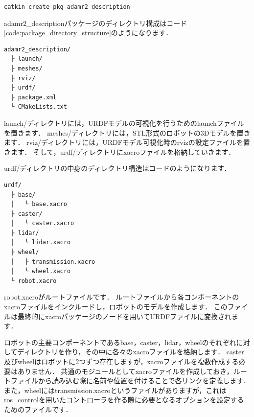 \documentclass[{../../master}]{subfiles}
\begin{document}
\begin{lstlisting}[language=sh, caption=Create a Package to put the URDF Model in]
catkin create pkg adamr2_description
\end{lstlisting}

\textsf{adamr2\_description}パッケージのディレクトリ構成はコード\ref{code:package_directory_structure}のようになります．

\begin{lstlisting}[language=sh, caption=Directory Structure of adamr2\_description, label=code:package_directory_structure]
adamr2_description/
  ├ launch/
  ├ meshes/
  ├ rviz/
  ├ urdf/
  ├ package.xml
  └ CMakeLists.txt
\end{lstlisting}

\textsf{launch/}ディレクトリには，URDFモデルの可視化を行うためのlaunchファイルを置きます．
\textsf{meshes/}ディレクトリには，STL形式のロボットの3Dモデルを置きます．
\textsf{rviz/}ディレクトリには，URDFモデル可視化時の\textsf{rviz}の設定ファイルを置きます．
そして，\textsf{urdf/}ディレクトリにxacroファイルを格納していきます．

\textsf{urdf/}ディレクトリの中身のディレクトリ構造はコードのようになります．

\begin{lstlisting}[language=sh, caption=Directory Structure of \textsf{urdf/}, label=code:urdf_directory_structure]
urdf/
  ├ base/
  │   └ base.xacro
  ├ caster/
  │   └ caster.xacro
  ├ lidar/
  │   └ lidar.xacro
  ├ wheel/
  │   ├ transmission.xacro
  │   └ wheel.xacro
  └ robot.xacro
\end{lstlisting}

\textsf{robot.xacro}がルートファイルです．
ルートファイルから各コンポーネントのxacroファイルをインクルードし，ロボットのモデルを作成します．
このファイルは最終的に\textsf{xacro}パッケージのノードを用いてURDFファイルに変換されます．

ロボットの主要コンポーネントである\textsf{base}，\textsf{caster}，\textsf{lidar}，\textsf{wheel}のそれぞれに対してディレクトリを作り，その中に各々のxacroファイルを格納します．
\textsf{caster}及び\textsf{wheel}はロボットに2つずつ存在しますが，xacroファイルを複数作成する必要はありません．
共通のモジュールとしてxacroファイルを作成しておき，ルートファイルから読み込む際に名前や位置を付けることで各リンクを定義します．
また，\textsf{wheel}には\textsf{transmission.xacro}というファイルがありますが，これは\textsf{ros\_control}を用いたコントローラを作る際に必要となるオプションを設定するためのファイルです．
\end{document}
